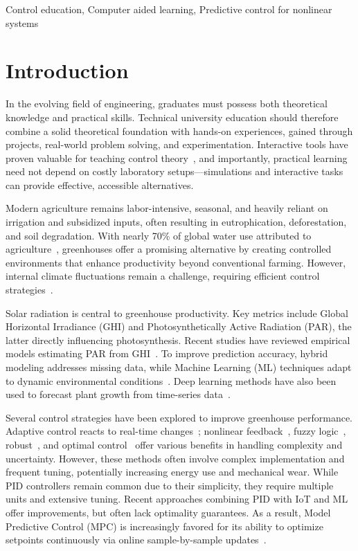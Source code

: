 \documentclass[conference]{IEEEtran}
\begin{document}
\begin{IEEEkeywords}
    Control education, Computer aided learning, Predictive control for nonlinear systems
\end{IEEEkeywords}

\section{Introduction}
In the evolving field of engineering, graduates must possess both theoretical knowledge and practical skills. Technical university education should therefore combine a solid theoretical foundation with hands-on experiences, gained through projects, real-world problem solving, and experimentation. Interactive tools have proven valuable for teaching control theory~\cite{Emami1991, Guzman2013}, and importantly, practical learning need not depend on costly laboratory setups—simulations and interactive tasks can provide effective, accessible alternatives.

Modern agriculture remains labor-intensive, seasonal, and heavily reliant on irrigation and subsidized inputs, often resulting in eutrophication, deforestation, and soil degradation. With nearly 70\% of global water use attributed to agriculture~\cite{Debroy2024}, greenhouses offer a promising alternative by creating controlled environments that enhance productivity beyond conventional farming. However, internal climate fluctuations remain a challenge, requiring efficient control strategies~\cite{Wu2019}.

Solar radiation is central to greenhouse productivity. Key metrics include Global Horizontal Irradiance (GHI) and Photosynthetically Active Radiation (PAR), the latter directly influencing photosynthesis. Recent studies have reviewed empirical models estimating PAR from GHI~\cite{NoriegaGardea2021}. To improve prediction accuracy, hybrid modeling addresses missing data, while Machine Learning (ML) techniques adapt to dynamic environmental conditions~\cite{Iddio2020, MaLu2022}. Deep learning methods have also been used to forecast plant growth from time-series data~\cite{Yasrab2021}.

Several control strategies have been explored to improve greenhouse performance. Adaptive control reacts to real-time changes~\cite{Tian2022}; nonlinear feedback~\cite{Bood2023}, fuzzy logic~\cite{smartcities7030055}, robust~\cite{Zhang2021}, and optimal control~\cite{Debroy2024, SVENSEN2024108578} offer various benefits in handling complexity and uncertainty. However, these methods often involve complex implementation and frequent tuning, potentially increasing energy use and mechanical wear. While PID controllers remain common due to their simplicity, they require multiple units and extensive tuning. Recent approaches combining PID with IoT and ML~\cite{Wang2024} offer improvements, but often lack optimality guarantees. As a result, Model Predictive Control (MPC) is increasingly favored for its ability to optimize setpoints continuously via online sample-by-sample updates~\cite{Hu2022}.
\end{document}
